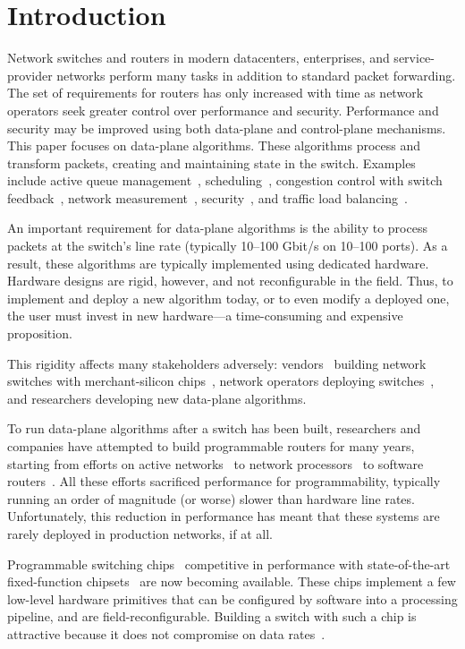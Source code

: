 \section{Introduction}
\label{s:intro}

Network switches and routers in modern datacenters, enterprises, and
service-provider networks perform many tasks in addition to standard
packet forwarding. The set of requirements for routers has only
increased with time as network operators seek greater control over
performance and security.  Performance and security may be improved
using both data-plane and control-plane mechanisms. This paper focuses
on data-plane algorithms. These algorithms process and transform
packets, creating and maintaining state in the switch. Examples
include active queue management~\cite{red,avq,codel},
scheduling~\cite{pifo_hotnets}, congestion control with switch
feedback~\cite{xcp, rcp, dctcp}, network
measurement~\cite{opensketch, bitmap_george},
security~\cite{dns_change}, and traffic load balancing~\cite{conga}.

An important requirement for data-plane algorithms is the ability to
process packets at the switch's line rate (typically 10--100 Gbit/s on
10--100 ports).  As a result, these
algorithms are typically implemented using dedicated
hardware. Hardware designs are rigid, however, and not reconfigurable
in the field. Thus, to implement and deploy a new algorithm today, or
to even modify a deployed one, the user must invest in new
hardware---a time-consuming and expensive proposition.

This rigidity affects many stakeholders adversely:
vendors~\cite{cisco_nexus, dell_force10, arista_7050} building network
switches with merchant-silicon chips~\cite{trident, tomahawk,
  mellanox}, network operators deploying
switches~\cite{google,facebook,vl2}, and researchers developing new
data-plane algorithms.

To run data-plane algorithms after a switch has been built,
researchers and companies have attempted to build programmable routers
for many years, starting from efforts on active
networks~\cite{active-nets} to network processors~\cite{ixp4xx} to
software routers~\cite{click, dpdk}. All these efforts
sacrificed performance for programmability, typically running an order
of magnitude (or worse) slower than hardware line
rates. Unfortunately, this reduction in performance has meant that
these systems are rarely deployed in production networks, if at all.

Programmable switching chips~\cite{flexpipe, xpliant, tofino} competitive in performance with state-of-the-art
fixed-function chipsets~\cite{trident, tomahawk, mellanox} are now
becoming available. These chips implement a few low-level hardware
primitives that can be configured by software into a processing
pipeline, and are
field-reconfigurable. Building
a switch with such a chip is attractive because it does not compromise
on data rates~\cite{rmt}.

